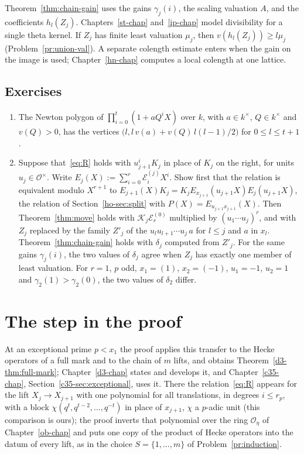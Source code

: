 \documentclass[reqno]{amsart}
\newcounter{chap}
\theoremstyle{definition}
\theoremstyle{plain}
\theoremstyle{remark}
\newcommand{\Oc}{\mathcal{O}}
\newcommand{\Ec}{\mathcal{E}}
\newcommand{\Kc}{\mathcal{K}}
\begin{document}
Theorem~\ref{thm:chain-gain} uses the gains \(\gamma_j(i)\), the scaling valuation \(A\), and the coefficients \(h_l(Z_j)\).  Chapters~\ref{st-chap} and~\ref{ip-chap} model divisibility for a single theta kernel.  If \(Z_j\) has finite least valuation \(\mu_j\), then \(v(h_l(Z_j)) \ge l\mu_j\) (Problem~\ref{pr:union-val}).  A separate colength estimate enters when the gain on the image is used; Chapter~\ref{hn-chap} computes a local colength at one lattice.

\subsection*{Exercises}

\begin{enumerate}
\item The Newton polygon of \(\prod_{i=0}^t (1 + aQ^iX)\) over \(k\), with \(a \in k^\times\), \(Q \in k^\times\) and \(v(Q) > 0\), has the vertices \(\bigl(l, l\,v(a) + v(Q)\,l(l-1)/2\bigr)\) for \(0 \le l \le t+1\).
\item Suppose that~\eqref{eq:R} holds with \(u_{j+1}^i K_j\) in place of \(K_j\) on the right, for units \(u_j \in \Oc^\times\).  Write \(E_j(X):=\sum_{i=0}^r \Ec^{(j)}_i X^i\).  Show first that the relation is equivalent modulo \(X^{r+1}\) to \(E_{j+1}(X)K_j=K_j E_{x_{j+1}}(u_{j+1}X) E_j(u_{j+1}X)\), the relation of Section~\ref{ho-sec:split} with \(P(X)=E_{u_{j+1}x_{j+1}}(X)\).  Then Theorem~\ref{thm:move} holds with \(\Kc_j\Ec^{(0)}_r\) multiplied by \((u_1 \cdots u_j)^r\), and with \(Z_j\) replaced by the family \(Z'_j\) of the \(u_l u_{l+1} \cdots u_j\, a\) for \(l \le j\) and \(a\) in \(x_l\).  Theorem~\ref{thm:chain-gain} holds with \(\delta_j\) computed from \(Z'_j\).  For the same gains \(\gamma_j(i)\), the two values of \(\delta_j\) agree when \(Z_j\) has exactly one member of least valuation.  For \(r = 1\), \(p\) odd, \(x_1 = (1)\), \(x_2 = (-1)\), \(u_1 = -1\), \(u_2 = 1\) and \(\gamma_2(1) > \gamma_2(0)\), the two values of \(\delta_2\) differ.
\end{enumerate}

\section{The step in the proof}\label{sec:proof}

At an exceptional prime \(p < x_1\) the proof \cite{GL} applies this transfer to the Hecke operators of a full mark and to the chain of \(m\) lifts, and obtains Theorem~\ref{d3-thm:full-mark}; Chapter~\ref{d3-chap} states and develops it, and Chapter~\ref{c35-chap}, Section~\ref{c35-sec:exceptional}, uses it.  There the relation~\eqref{eq:R} appears for the lift \(X_j \to X_{j+1}\) with one polynomial for all translations, in degrees \(i \le r_p\), with a block \(\chi(q^t, q^{t-2}, \dots, q^{-t})\) in place of \(x_{j+1}\), \(\chi\) a \(p\)-adic unit (this comparison is ours); the proof inverts that polynomial over the ring \(\Oc_\eta\) of Chapter~\ref{ob-chap} and puts one copy of the product of Hecke operators into the datum of every lift, as in the choice \(S = \{1, \dots, m\}\) of Problem~\ref{pr:induction}.
\end{document}
